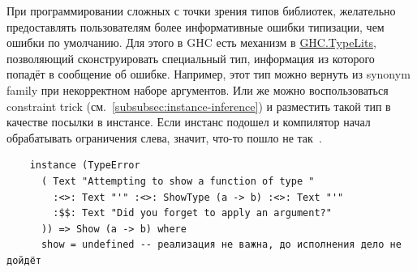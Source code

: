 При программировании сложных с точки зрения типов библиотек, желательно предоставлять пользователям более информативные ошибки типизации, чем ошибки по умолчанию.
Для этого в GHC есть механизм в \href{https://hackage.haskell.org/package/base-4.20.0.1/docs/GHC-TypeLits.html}{GHC.TypeLits}, позволяющий сконструировать специальный тип, информация из которого попадёт в сообщение об ошибке.
Например, этот тип можно вернуть из synonym family при некорректном наборе аргументов.
Или же можно воспользоваться constraint trick (см.\ \ref{subsubsec:instance-inference}) и разместить такой тип в качестве посылки в инстансе.
Если инстанс подошел и компилятор начал обрабатывать ограничения слева, значит, что-то пошло не так~\cite[глава 12]{maguire-types}.

\begin{verbatim}
    instance (TypeError
      ( Text "Attempting to show a function of type "
        :<>: Text "'" :<>: ShowType (a -> b) :<>: Text "'"
        :$$: Text "Did you forget to apply an argument?"
      )) => Show (a -> b) where
      show = undefined -- реализация не важна, до исполнения дело не дойдёт
\end{verbatim}
